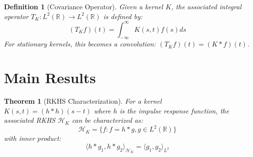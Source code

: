 \documentclass{article}
\newtheorem{theorem}{Theorem}
\newtheorem{definition}{Definition}
\begin{document}
\begin{definition}[Covariance Operator]
Given a kernel $K$, the associated integral operator $T_K: L^2(\mathbb{R}) \rightarrow L^2(\mathbb{R})$ is defined by:
\begin{equation}
(T_K f)(t) = \int_{-\infty}^{\infty} K(s,t)f(s)ds
\end{equation}
For stationary kernels, this becomes a convolution: $(T_K f)(t) = (K * f)(t)$.
\end{definition}

\section{Main Results}

\begin{theorem}[RKHS Characterization]
\label{thm:rkhs}
For a kernel $K(s,t) = (h * h)(s-t)$ where $h$ is the impulse response function, the associated RKHS $\mathcal{H}_K$ can be characterized as:
\begin{equation}
\mathcal{H}_K = \{f : f = h * g, g \in L^2(\mathbb{R})\}
\end{equation}
with inner product:
\begin{equation}
\langle h * g_1, h * g_2 \rangle_{\mathcal{H}_K} = \langle g_1, g_2 \rangle_{L^2}
\end{equation}
\end{theorem}
\end{document}
